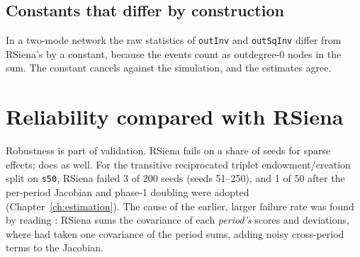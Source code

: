 \subsection{Constants that differ by construction}
In a two-mode network the raw statistics of \texttt{outInv} and \texttt{outSqInv} differ from RSiena's by a constant, because the events count as outdegree-0 nodes in the sum. The constant cancels against the simulation, and the estimates agree.

\section{Reliability compared with RSiena}
Robustness is part of validation. RSiena fails on a share of seeds for sparse effects; \nwsaom{} does as well. For the transitive reciprocated triplet endowment/creation split on \texttt{s50}, RSiena failed 3 of 200 seeds (seeds 51--250), and \nwsaom{} 1 of 50 after the per-period Jacobian and phase-1 doubling were adopted (Chapter~\ref{ch:estimation}). The cause of the earlier, larger failure rate was found by reading : RSiena sums the covariance of each \emph{period's} scores and deviations, where \nwsaom{} had taken one covariance of the period sums, adding noisy cross-period terms to the Jacobian.

